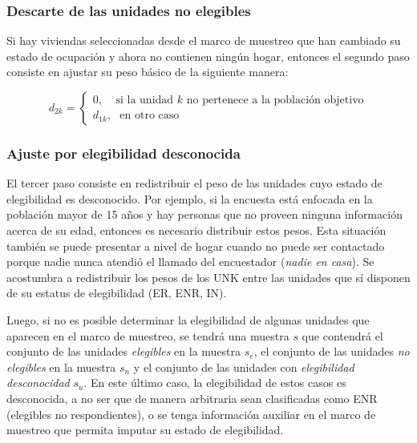 \documentclass[
  12pt,
  spanish,
]{book}
\begin{document}
\hypertarget{descarte-de-las-unidades-no-elegibles}{%
\subsubsection*{Descarte de las unidades no elegibles}\label{descarte-de-las-unidades-no-elegibles}}

Si hay viviendas seleccionadas desde el marco de muestreo que han cambiado su estado de ocupación y ahora no contienen ningún hogar, entonces el segundo paso consiste en ajustar su peso básico de la siguiente manera:

\[
d_{2k} = 
\begin{cases}
0, \ \ \ \ \ \text{si la unidad $k$ no pertenece a la población objetivo}\\
d_{1k},\ \ \ \text{en otro caso }
\end{cases}
\]

\hypertarget{ajuste-por-elegibilidad-desconocida}{%
\subsubsection*{Ajuste por elegibilidad desconocida}\label{ajuste-por-elegibilidad-desconocida}}

El tercer paso consiste en redistribuir el peso de las unidades cuyo estado de elegibilidad es desconocido. Por ejemplo, si la encuesta está enfocada en la población mayor de 15 años y hay personas que no proveen ninguna información acerca de su edad, entonces es necesario distribuir estos pesos. Esta situación también se puede presentar a nivel de hogar cuando no puede ser contactado porque nadie nunca atendió el llamado del encuestador (\emph{nadie en casa}). Se acostumbra a redistribuir los pesos de los UNK entre las unidades que sí disponen de su estatus de elegibilidad (ER, ENR, IN).

Luego, si no es posible determinar la elegibilidad de algunas unidades que aparecen en el marco de muestreo, se tendrá una muestra \(s\) que contendrá el conjunto de las unidades \emph{elegibles} en la muestra \(s_{e}\), el conjunto de las unidades \emph{no elegibles} en la muestra \(s_{n}\) y el conjunto de las unidades con \emph{elegibilidad desconocidad} \(s_{u}\). En este último caso, la elegibilidad de estos casos es desconocida, a no ser que de manera arbitraria sean clasificadas como ENR (elegibles no respondientes), o se tenga información auxiliar en el marco de muestreo que permita imputar su estado de elegibilidad.
\end{document}
